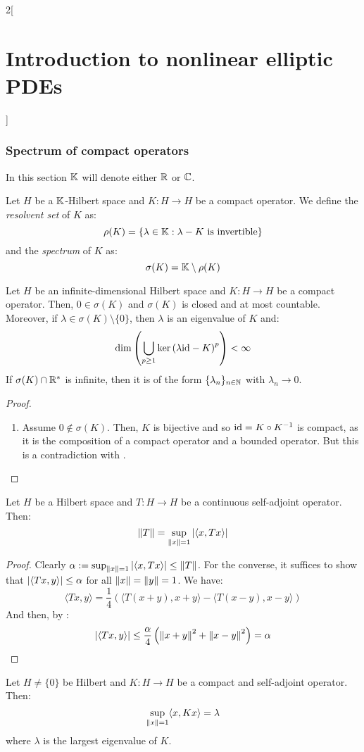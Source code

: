 \documentclass[../../../main_math.tex]{subfiles}
\begin{document}
\begin{multicols}{2}[\section{Introduction to nonlinear elliptic PDEs}]
  \subsubsection{Spectrum of compact operators}
  In this section $\mathbb{K}$ will denote either $\mathbb{R}$ or $\mathbb{C}$.
  \begin{definition}
    Let $H$ be a $\mathbb{K}$-Hilbert space and $K:H\to H$ be a compact operator. We define the \emph{resolvent set} of $K$ as:
    $$
      \rho(K)=\{\lambda\in \mathbb{K}: \lambda-K \text{ is invertible}\}
    $$
    and the \emph{spectrum} of $K$ as:
    $$
      \sigma(K)=\mathbb{K}\setminus \rho(K)
    $$
  \end{definition}
  \begin{theorem}
    Let $H$ be an infinite-dimensional Hilbert space and $K:H\to H$ be a compact operator. Then, $0\in \sigma(K)$ and $\sigma(K)$ is closed and at most countable. Moreover, if $\lambda\in \sigma(K)\setminus\{0\}$, then $\lambda$ is an eigenvalue of $K$ and:
    $$
      \dim\left(\bigcup_{p\geq 1}\ker{(\lambda\mathrm{id}-K)}^p\right)<\infty
    $$
    If $\sigma(K)\cap\mathbb{R}^*$ is infinite, then it is of the form $\{\lambda_n\}_{n\in \mathbb{N}}$ with $\lambda_n\to 0$.
  \end{theorem}
  \begin{proof}
    \begin{enumerate}
      \item Assume $0\notin \sigma(K)$. Then, $K$ is bijective and so $\mathrm{id} = K\circ K^{-1}$ is compact, as it is the composition of a compact operator and a bounded operator. But this is a contradiction with .
    \end{enumerate}
  \end{proof}
  \begin{lemma}
    Let $H$ be a Hilbert space and $T:H\to H$ be a continuous self-adjoint operator. Then:
    $$
      \left\|T\right\|=\sup_{\left\|x\right\|=1}\abs{\langle x,Tx\rangle}
    $$
  \end{lemma}
  \begin{proof}
    Clearly $\alpha:=\sup_{\left\|x\right\|=1}\abs{\langle x,Tx\rangle}\leq \left\|T\right\|$. For the converse, it suffices to show that $\abs{\langle Tx,y\rangle}\leq \alpha$ for all $\left\|x\right\|=\left\|y\right\|=1$. We have:
    $$
      \langle Tx,y\rangle = \frac{1}{4}\left(\langle T(x+y),x+y\rangle-\langle T(x-y),x-y\rangle\right)
    $$
    And then, by :
    $$
      \abs{\langle Tx,y\rangle}\leq \frac{\alpha}{4}\left(\left\|x+y\right\|^2+\left\|x-y\right\|^2\right)= \alpha
    $$
  \end{proof}
  \begin{lemma}
    Let $H\ne\{ 0\}$ be Hilbert and $K:H\to H$ be a compact and self-adjoint operator. Then:
    $$
      \sup_{\left\|x\right\|=1}\langle x,Kx\rangle=\lambda
    $$
    where $\lambda$ is the largest eigenvalue of $K$.
  \end{lemma}

\end{multicols}
\end{document}
